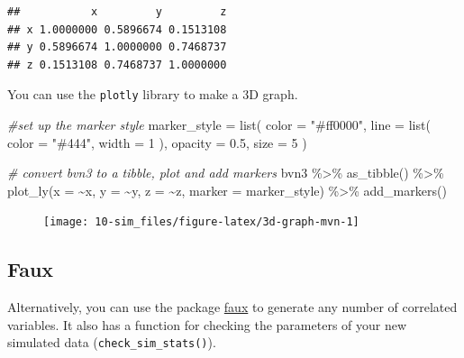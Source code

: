 \documentclass[
  oneside]{book}
\newenvironment{Shaded}{\begin{snugshade}}{\end{snugshade}}
\newcommand{\AttributeTok}[1]{\textcolor[rgb]{0.77,0.63,0.00}{#1}}
\newcommand{\CommentTok}[1]{\textcolor[rgb]{0.56,0.35,0.01}{\textit{#1}}}
\newcommand{\DecValTok}[1]{\textcolor[rgb]{0.00,0.00,0.81}{#1}}
\newcommand{\FloatTok}[1]{\textcolor[rgb]{0.00,0.00,0.81}{#1}}
\newcommand{\FunctionTok}[1]{\textcolor[rgb]{0.00,0.00,0.00}{#1}}
\newcommand{\NormalTok}[1]{#1}
\newcommand{\OtherTok}[1]{\textcolor[rgb]{0.56,0.35,0.01}{#1}}
\newcommand{\SpecialCharTok}[1]{\textcolor[rgb]{0.00,0.00,0.00}{#1}}
\newcommand{\StringTok}[1]{\textcolor[rgb]{0.31,0.60,0.02}{#1}}
\begin{document}
\begin{verbatim}
##           x         y         z
## x 1.0000000 0.5896674 0.1513108
## y 0.5896674 1.0000000 0.7468737
## z 0.1513108 0.7468737 1.0000000
\end{verbatim}

You can use the \texttt{plotly} library to make a 3D graph.

\begin{Shaded}
\begin{Highlighting}[]
\CommentTok{\#set up the marker style}
\NormalTok{marker\_style }\OtherTok{=} \FunctionTok{list}\NormalTok{(}
    \AttributeTok{color =} \StringTok{"\#ff0000"}\NormalTok{, }
    \AttributeTok{line =} \FunctionTok{list}\NormalTok{(}
      \AttributeTok{color =} \StringTok{"\#444"}\NormalTok{, }
      \AttributeTok{width =} \DecValTok{1}
\NormalTok{    ), }
    \AttributeTok{opacity =} \FloatTok{0.5}\NormalTok{,}
    \AttributeTok{size =} \DecValTok{5}
\NormalTok{  )}

\CommentTok{\# convert bvn3 to a tibble, plot and add markers}
\NormalTok{bvn3 }\SpecialCharTok{\%\textgreater{}\%}
  \FunctionTok{as\_tibble}\NormalTok{() }\SpecialCharTok{\%\textgreater{}\%}
  \FunctionTok{plot\_ly}\NormalTok{(}\AttributeTok{x =} \SpecialCharTok{\textasciitilde{}}\NormalTok{x, }\AttributeTok{y =} \SpecialCharTok{\textasciitilde{}}\NormalTok{y, }\AttributeTok{z =} \SpecialCharTok{\textasciitilde{}}\NormalTok{z, }\AttributeTok{marker =}\NormalTok{ marker\_style) }\SpecialCharTok{\%\textgreater{}\%}
  \FunctionTok{add\_markers}\NormalTok{()}
\end{Highlighting}
\end{Shaded}

\begin{figure}

{\centering \texttt{[image: 10-sim\_files/figure-latex/3d-graph-mvn-1]} 

}

\end{figure}

\hypertarget{faux}{%
\subsection{Faux}\label{faux}}

Alternatively, you can use the package \href{https://debruine.github.io/faux/}{faux} to generate any number of correlated variables. It also has a function for checking the parameters of your new simulated data (\texttt{check\_sim\_stats()}).
\end{document}
